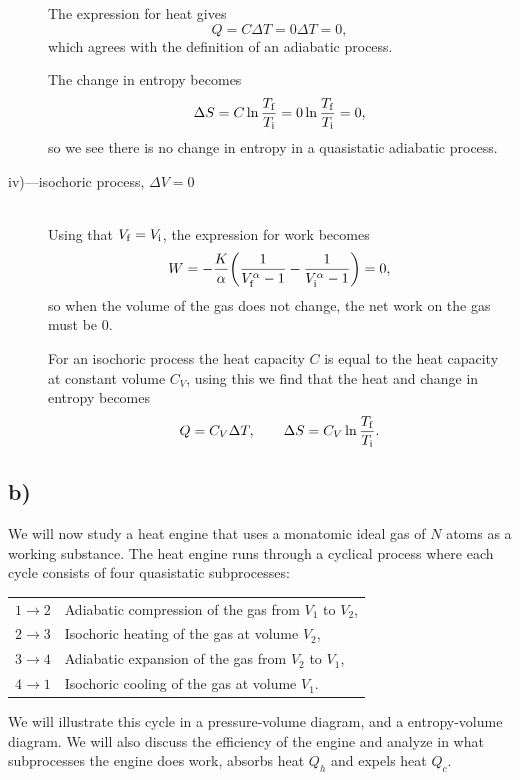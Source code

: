 \documentclass[a4paper, 11pt, titlepage, english]{article}
\begin{document}
\begin{description}
The expression for heat gives
$$Q = C\Delta T = 0\Delta T = 0,$$
which agrees with the definition of an adiabatic process.

The change in entropy becomes
$$\Delta S = C\ln \frac{T_{\rm f}}{T_{\rm i}} = 0\ln\frac{T_{\rm f}}{T_{\rm i}} = 0,$$
so we see there is no change in entropy in a quasistatic adiabatic process.

\item[iv)---isochoric process, $\Delta V = 0$] $ $ \\
Using that $V_{\rm f} = V_{\rm i}$, the expression for work becomes
$$W = -\frac{K}{\alpha}\bigg(\frac{1}{V_{\rm f}^\alpha-1} - \frac{1}{V_{\rm i}^\alpha-1}\bigg) = 0,$$
so when the volume of the gas does not change, the net work on the gas must be 0.

For an isochoric process the heat capacity $C$ is equal to the heat capacity at constant volume $C_V$, using this we find that the heat and change in entropy becomes
$$Q = C_V \Delta T, \qquad \Delta S = C_V \ln \frac{T_{\rm f}}{T_{\rm i}}.$$

\end{description}

\subsection*{b)}
We will now study a heat engine that uses a monatomic ideal gas of $N$ atoms as a working substance. The heat engine runs through a cyclical process where each cycle consists of four quasistatic subprocesses:

\begin{center}
\begin{tabular}{c l}
$1 \rightarrow 2$ & Adiabatic compression of the gas from $V_1$ to $V_2$,\\[-0.2cm]
$2 \rightarrow 3$ & Isochoric heating of the gas at volume $V_2$, \\[-0.2cm]
$3 \rightarrow 4$ & Adiabatic expansion of the gas from $V_2$ to $V_1$, \\[-0.2cm]
$4 \rightarrow 1$ & Isochoric cooling of the gas at volume $V_1$.
\end{tabular} 
\end{center}

We will illustrate this cycle in a pressure-volume diagram, and a entropy-volume diagram. We will also discuss the efficiency of the engine and analyze in what subprocesses the engine does work, absorbs heat $Q_h$ and expels heat $Q_c$.
\end{document}
